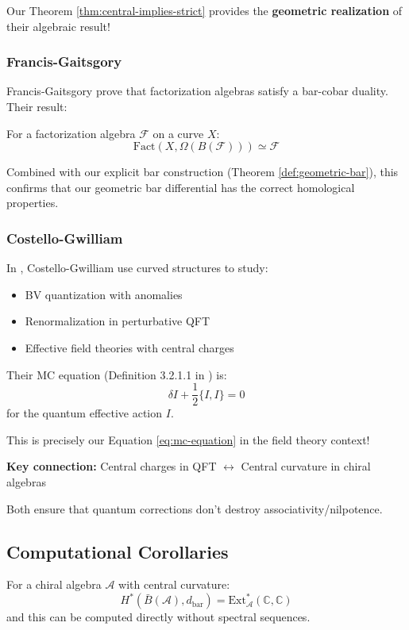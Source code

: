 Our Theorem \ref{thm:central-implies-strict} provides the \textbf{geometric realization} 
of their algebraic result!

\subsubsection{Francis-Gaitsgory}

Francis-Gaitsgory \cite{FG-factorization} prove that factorization algebras satisfy a 
bar-cobar duality. Their result:

\begin{theorem}[FG, Theorem 7.2.1]
For a factorization algebra $\mathcal{F}$ on a curve $X$:
$$\text{Fact}(X, \Omega(B(\mathcal{F}))) \simeq \mathcal{F}$$
\end{theorem}

Combined with our explicit bar construction (Theorem \ref{def:geometric-bar}), this confirms 
that our geometric bar differential has the correct homological properties.

\subsubsection{Costello-Gwilliam}

In \cite{CG-vol2}, Costello-Gwilliam use curved structures to study:
\begin{itemize}
\item BV quantization with anomalies
\item Renormalization in perturbative QFT
\item Effective field theories with central charges
\end{itemize}

Their MC equation (Definition 3.2.1.1 in \cite{CG-vol2}) is:
$$\delta I + \frac{1}{2}\{I, I\} = 0$$
for the quantum effective action $I$.

This is precisely our Equation \eqref{eq:mc-equation} in the field theory context!

\textbf{Key connection:}
Central charges in QFT $\leftrightarrow$ Central curvature in chiral algebras

Both ensure that quantum corrections don't destroy associativity/nilpotence.

\subsection{Computational Corollaries}

\begin{corollary}\label{cor:bar-computes-ext}
For a chiral algebra $\mathcal{A}$ with central curvature:
\begin{equation}
H^*(\bar{B}(\mathcal{A}), d_{\text{bar}}) = \text{Ext}_{\mathcal{A}}^*(\mathbb{C}, \mathbb{C})
\end{equation}
and this can be computed directly without spectral sequences.
\end{corollary}

